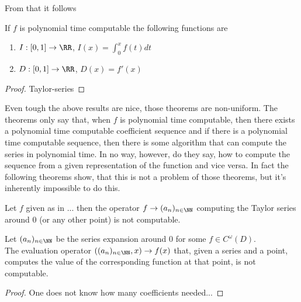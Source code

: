 		From that it follows
		\begin{corollary}
			If $f$ is polynomial time computable the following functions are
			\begin{enumerate}
				\item $I: [0,1] \to \RR$, $I(x) = \int_0^x f(t) dt$
				\item $D: [0,1] \to \RR$, $D(x) = f'(x)$ 
			\end{enumerate}
			\begin{proof}
				Taylor-series
			\end{proof}
		\end{corollary}
		Even tough the above results are nice, those theorems are non-uniform.
		The theorems only say that, when $f$ is polynomial time computable, then there exists 
		a polynomial time computable coefficient sequence and if there is a polynomial time computable sequence, then
		there is some algorithm that can compute the series in polynomial time.
		In no way, however, do they say, how to compute the sequence from a given representation of the function and vice versa.
		In fact the following theorems show, that this is not a problem of those theorems, but it's inherently impossible to do this.
		\begin{theorem}
			Let $f$ given as in ... then the operator $f \to (a_n)_{n \in \NN}$ computing the Taylor series around $0$ (or any other point) is not computable.
		\end{theorem} 
		\begin{theorem}
			Let $(a_n)_{n \in \NN}$ be the series expansion around $0$ for some $f \in C^\omega(D)$.\\
			The evaluation operator $((a_n)_{n \in \NN}, x) \to f(x)$ that, given a series and a point, computes the value of the corresponding function at that point, is not computable.
			\begin{proof}
				One does not know how many coefficients needed...
			\end{proof}
		\end{theorem} 

